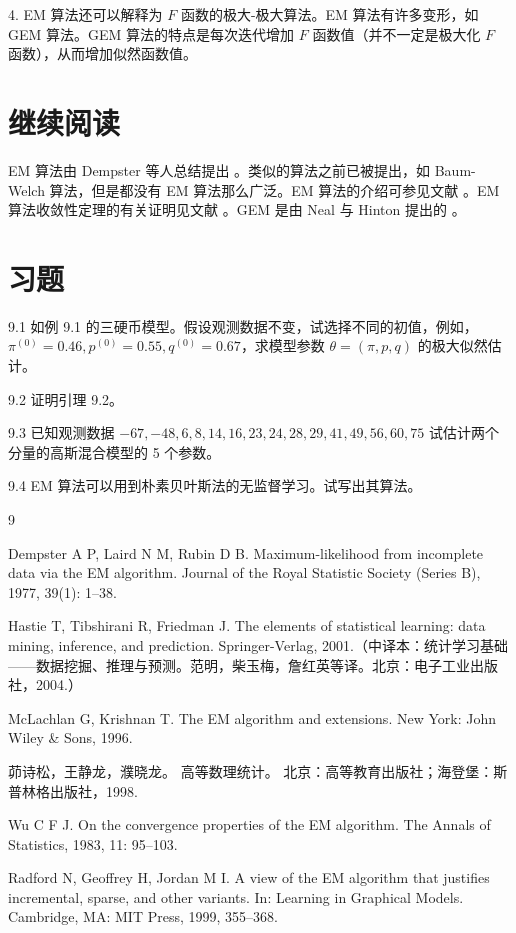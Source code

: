 \documentclass[UTF8,12pt,a4paper,fontset=fandol]{ctexart}
\begin{document}
4. EM 算法还可以解释为 $F$ 函数的极大-极大算法。EM 算法有许多变形，如 GEM 算法。GEM 算法的特点是每次迭代增加 $F$ 函数值（并不一定是极大化 $F$ 函数），从而增加似然函数值。

\section*{继续阅读}

EM 算法由 Dempster 等人总结提出 \cite{dempster1977maximum}。类似的算法之前已被提出，如 Baum-Welch 算法，但是都没有 EM 算法那么广泛。EM 算法的介绍可参见文献 \cite{hastie2001elements,mclachlan1996em,mao1998advanced}。EM 算法收敛性定理的有关证明见文献 \cite{wu1983convergence}。GEM 是由 Neal 与 Hinton 提出的 \cite{neal1999view}。

\section*{习题}

9.1 如例 9.1 的三硬币模型。假设观测数据不变，试选择不同的初值，例如，$\pi^{(0)}=0.46,p^{(0)}=0.55,q^{(0)}=0.67$，求模型参数 $\theta=(\pi,p,q)$ 的极大似然估计。

9.2 证明引理 9.2。

9.3 已知观测数据 $-67,-48,6,8,14,16,23,24,28,29,41,49,56,60,75$ 试估计两个分量的高斯混合模型的 5 个参数。

9.4 EM 算法可以用到朴素贝叶斯法的无监督学习。试写出其算法。

\begin{thebibliography}{9}

Dempster A P, Laird N M, Rubin D B.
Maximum-likelihood from incomplete data via the EM algorithm.
Journal of the Royal Statistic Society (Series B), 1977, 39(1): 1--38.

Hastie T, Tibshirani R, Friedman J.
The elements of statistical learning: data mining, inference, and prediction.
Springer-Verlag, 2001.（中译本：统计学习基础——数据挖掘、推理与预测。范明，柴玉梅，詹红英等译。北京：电子工业出版社，2004.）

McLachlan G, Krishnan T.
The EM algorithm and extensions.
New York: John Wiley \& Sons, 1996.

茆诗松，王静龙，濮晓龙。
高等数理统计。
北京：高等教育出版社；海登堡：斯普林格出版社，1998.

Wu C F J.
On the convergence properties of the EM algorithm.
The Annals of Statistics, 1983, 11: 95--103.

Radford N, Geoffrey H, Jordan M I.
A view of the EM algorithm that justifies incremental, sparse, and other variants.
In: Learning in Graphical Models.
Cambridge, MA: MIT Press, 1999, 355--368.

\end{thebibliography}
\end{document}
